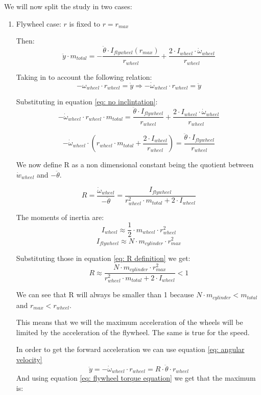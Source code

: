 We will now split the study in two cases:
\begin{enumerate}
    \item Flywheel case: $r$ is fixed to $r = r_{max}$ 
    
    Then:  
    \[\ddot{y}\cdot m_{total} = - \frac{\ddot{\theta}\cdot I_{flywheel}(r_{max})}
    {r_{wheel}} + \frac{2\cdot I_{wheel} \cdot  \dot{\omega}_{wheel}}{r_{wheel}}\]

    Taking in to account the following relation:
    \begin{equation} \label{eq: angular velocity}
        -\omega_{wheel} \cdot  r_{wheel} = \dot{y} \Rightarrow  -\dot{\omega}_{wheel} \cdot  r_{wheel} = \ddot{y}  
    \end{equation}

    Substituting in equation \ref{eq: no inclintation}:
    \[-\dot{\omega}_{wheel} \cdot  r_{wheel}\cdot m_{total} = \frac{\ddot{\theta}\cdot I_{flywheel}}
    {r_{wheel}} + \frac{2\cdot I_{wheel} \cdot  \dot{\omega}_{wheel}}{r_{wheel}} \]

    \[-\dot{\omega}_{wheel} \cdot (r_{wheel}\cdot m_{total} +  \frac{2\cdot I_{wheel} }{r_{wheel}}) = 
    \frac{\ddot{\theta}\cdot I_{flywheel}}{r_{wheel}}\]


    We now define R as a non dimensional constant being the quotient between $\dot{w}_{wheel}$ and $-\ddot{\theta}$.

    \begin{equation}\label{eq: R definition}
        R = \frac{\dot{\omega}_{wheel}}{-\ddot{\theta}} = 
    \frac{I_{flywheel}}
    {r_{wheel}^2\cdot m_{total} +  2\cdot I_{wheel}}
    \end{equation}

    The moments of inertia are:
    \[I_{wheel} \approx \frac{1}{2} \cdot m_{wheel} \cdot  r_{wheel}^2\]
    \[I_{flywheel} \approx N \cdot  m_{cylinder} \cdot  r_{max}^2\]

    Substituting those in equation \ref{eq: R definition} we get:
    \[R \approx
    \frac{ N \cdot  m_{cylinder} \cdot  r_{max}^2}
    {r_{wheel}^2\cdot m_{total} +  2\cdot I_{wheel}} < 1 \] 

    We can see that R will always be smaller than 1 because $N \cdot  m_{cylinder} < m_{total} $ and $r_{max} < r_{wheel}$.
    
    This means that we will the maximum acceleration of the wheels will be limited by the acceleration of the flywheel. The same is true for the speed.

    In  order to get the forward acceleration we can use equation \ref{eq: angular velocity}
    \[\ddot{y} = -\dot{\omega}_{wheel} \cdot  r_{wheel} = R \cdot  \ddot{\theta} \cdot  r_{wheel}\]
    And using equation \ref{eq: flywheel torque equation} we get that the maximum is:


\end{enumerate}
